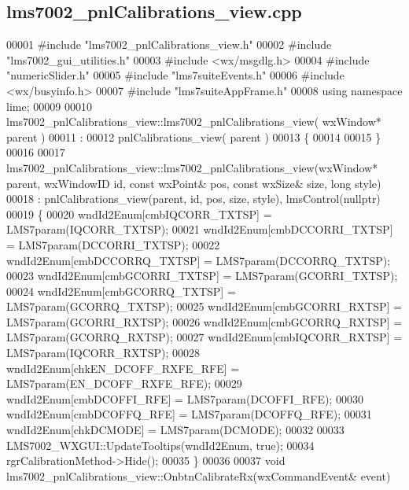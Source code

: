 \subsection{lms7002\+\_\+pnl\+Calibrations\+\_\+view.\+cpp}
\label{lms7002__pnlCalibrations__view_8cpp_source}

\begin{DoxyCode}
00001 \textcolor{preprocessor}{#include "lms7002_pnlCalibrations_view.h"}
00002 \textcolor{preprocessor}{#include "lms7002_gui_utilities.h"}
00003 \textcolor{preprocessor}{#include <wx/msgdlg.h>}
00004 \textcolor{preprocessor}{#include "numericSlider.h"}
00005 \textcolor{preprocessor}{#include "lms7suiteEvents.h"}
00006 \textcolor{preprocessor}{#include <wx/busyinfo.h>}
00007 \textcolor{preprocessor}{#include "lms7suiteAppFrame.h"}
00008 \textcolor{keyword}{using namespace }lime;
00009 
00010 lms7002_pnlCalibrations_view::lms7002_pnlCalibrations_view( wxWindow* parent )
00011 :
00012 pnlCalibrations_view( parent )
00013 \{
00014 
00015 \}
00016 
00017 lms7002_pnlCalibrations_view::lms7002_pnlCalibrations_view(wxWindow* parent, wxWindowID \textcolor{keywordtype}{id}, \textcolor{keyword}{const} wxPoint& 
      pos, \textcolor{keyword}{const} wxSize& size, \textcolor{keywordtype}{long} style)
00018     : pnlCalibrations_view(parent, id, pos, size, style), lmsControl(nullptr)
00019 \{
00020     wndId2Enum[cmbIQCORR_TXTSP] = LMS7param(IQCORR_TXTSP);
00021     wndId2Enum[cmbDCCORRI_TXTSP] = LMS7param(DCCORRI_TXTSP);
00022     wndId2Enum[cmbDCCORRQ_TXTSP] = LMS7param(DCCORRQ_TXTSP);
00023     wndId2Enum[cmbGCORRI_TXTSP] = LMS7param(GCORRI_TXTSP);
00024     wndId2Enum[cmbGCORRQ_TXTSP] = LMS7param(GCORRQ_TXTSP);
00025     wndId2Enum[cmbGCORRI_RXTSP] = LMS7param(GCORRI_RXTSP);
00026     wndId2Enum[cmbGCORRQ_RXTSP] = LMS7param(GCORRQ_RXTSP);
00027     wndId2Enum[cmbIQCORR_RXTSP] = LMS7param(IQCORR_RXTSP);
00028     wndId2Enum[chkEN_DCOFF_RXFE_RFE] = LMS7param(EN_DCOFF_RXFE_RFE);
00029     wndId2Enum[cmbDCOFFI_RFE] = LMS7param(DCOFFI_RFE);
00030     wndId2Enum[cmbDCOFFQ_RFE] = LMS7param(DCOFFQ_RFE);
00031     wndId2Enum[chkDCMODE] = LMS7param(DCMODE);
00032 
00033     LMS7002_WXGUI::UpdateTooltips(wndId2Enum, \textcolor{keyword}{true});
00034     rgrCalibrationMethod->Hide();
00035 \}
00036 
00037 \textcolor{keywordtype}{void} lms7002_pnlCalibrations_view::OnbtnCalibrateRx(wxCommandEvent& event)

\end{DoxyCode}
